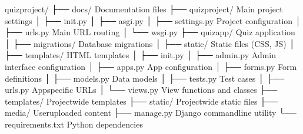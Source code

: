 \documentclass[letterpaper,10pt,english]{sphinxmanual}
\begin{document}
\begin{sphinxVerbatim}[commandchars=\\\{\}]
quiz\PYGZus{}project/
├── docs/                  \PYGZsh{} Documentation files
├── quiz\PYGZus{}project/          \PYGZsh{} Main project settings
│   ├── \PYGZus{}\PYGZus{}init\PYGZus{}\PYGZus{}.py
│   ├── asgi.py
│   ├── settings.py        \PYGZsh{} Project configuration
│   ├── urls.py            \PYGZsh{} Main URL routing
│   └── wsgi.py
├── quiz\PYGZus{}app/              \PYGZsh{} Quiz application
│   ├── migrations/        \PYGZsh{} Database migrations
│   ├── static/            \PYGZsh{} Static files (CSS, JS)
│   ├── templates/         \PYGZsh{} HTML templates
│   ├── \PYGZus{}\PYGZus{}init\PYGZus{}\PYGZus{}.py
│   ├── admin.py           \PYGZsh{} Admin interface configuration
│   ├── apps.py            \PYGZsh{} App configuration
│   ├── forms.py           \PYGZsh{} Form definitions
│   ├── models.py          \PYGZsh{} Data models
│   ├── tests.py           \PYGZsh{} Test cases
│   ├── urls.py            \PYGZsh{} App\PYGZhy{}specific URLs
│   └── views.py           \PYGZsh{} View functions and classes
├── templates/             \PYGZsh{} Project\PYGZhy{}wide templates
├── static/                \PYGZsh{} Project\PYGZhy{}wide static files
├── media/                 \PYGZsh{} User\PYGZhy{}uploaded content
├── manage.py              \PYGZsh{} Django command\PYGZhy{}line utility
└── requirements.txt       \PYGZsh{} Python dependencies
\end{sphinxVerbatim}
\end{document}
